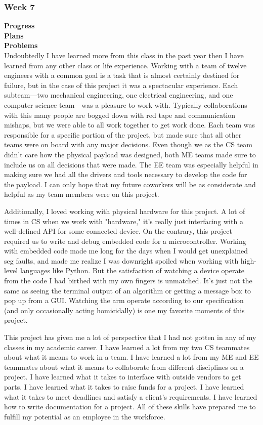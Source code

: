 \subsubsection{Week 7}
\textbf{Progress} \\ 
\textbf{Plans} \\ 
\textbf{Problems} \\ 
Undoubtedly I have learned more from this class in the past year then I have learned from any other class or life experience. Working with a team of twelve engineers with a common goal is a task that is almost certainly destined for failure, but in the case of this project it was a spectacular experience. Each subteam—two mechanical engineering, one electrical engineering, and one computer science team—was a pleasure to work with. Typically collaborations with this many people are bogged down with red tape and communication mishaps, but we were able to all work together to get work done. Each team was responsible for a specific portion of the project, but made sure that all other teams were on board with any major decisions. Even though we as the CS team didn't care how the physical payload was designed, both ME teams made sure to include us on all decisions that were made. The EE team was especially helpful in making sure we had all the drivers and tools necessary to develop the code for the payload. I can only hope that my future coworkers will be as considerate and helpful as my team members were on this project.

Additionally, I loved working with physical hardware for this project. A lot of times in CS when we work with "hardware," it's really just interfacing with a well-defined API for some connected device. On the contrary, this project required us to write and debug embedded code for a microcontroller. Working with embedded code made me long for the days when I would get unexplained seg faults, and made me realize I was downright spoiled when working with high-level languages like Python. But the satisfaction of watching a device operate from the code I had birthed with my own fingers is unmatched. It's just not the same as seeing the terminal output of an algorithm or getting a message box to pop up from a GUI. Watching the arm operate according to our specification (and only occasionally acting homicidally) is one my favorite moments of this project.

This project has given me a lot of perspective that I had not gotten in any of my classes in my academic career. I have learned a lot from my two CS teammates about what it means to work in a team. I have learned a lot from my ME and EE teammates about what it means to collaborate from different disciplines on a project. I have learned what it takes to interface with outside vendors to get parts. I have learned what it takes to raise funds for a project. I have learned what it takes to meet deadlines and satisfy a client's requirements. I have learned how to write documentation for a project. All of these skills have prepared me to fulfill my potential as an employee in the workforce.

